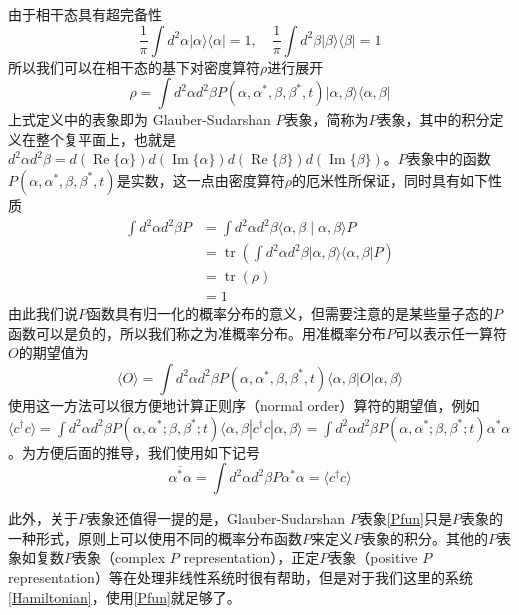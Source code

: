 由于相干态具有超完备性
\begin{equation}
\frac{1}{\pi} \int d^{2} \alpha|\alpha\rangle\langle\alpha|=1, \quad
\frac{1}{\pi} \int d^{2} \beta|\beta\rangle\langle\beta|=1
\end{equation}
所以我们可以在相干态的基下对密度算符$\rho$进行展开
\begin{equation}
\rho=\int d^{2}\alpha d^{2}\beta P(\alpha,\alpha^{*},\beta,\beta^{*},t)|\alpha,\beta\rangle \langle \alpha,\beta| \label{Pfun} 
\end{equation}
上式定义中的表象即为 Glauber-Sudarshan $P$表象，简称为$P$表象，其中的积分定义在整个复平面上，也就是$d^{2} \alpha d^{2} \beta=d(\operatorname{Re}\{\alpha\}) d(\operatorname{Im}\{\alpha\}) d(\operatorname{Re}\{\beta\}) d(\operatorname{Im}\{\beta\})$。$P$表象中的函数$P(\alpha,\alpha^{*},\beta,\beta^{*},t)$是实数，这一点由密度算符$\rho$的厄米性所保证，同时具有如下性质
\begin{equation}
\begin{aligned}
\int d^{2} \alpha d^{2}\beta P &=\int d^{2} \alpha d^{2}\beta \langle\alpha,\beta \mid \alpha,\beta \rangle P \\
&=\operatorname{tr}\left(\int d^{2} \alpha d^{2}\beta |\alpha,\beta\rangle\langle\alpha,\beta| P\right) \\
&=\operatorname{tr}(\rho) \\
&=1
\end{aligned}
\end{equation}
由此我们说$P$函数具有归一化的概率分布的意义，但需要注意的是某些量子态的$P$函数可以是负的，所以我们称之为准概率分布。用准概率分布$P$可以表示任一算符$O$的期望值为
\begin{equation}
\langle{O}\rangle=\int d^{2}\alpha d^{2}\beta P(\alpha,\alpha^{*},\beta,\beta^{*},t)\langle \alpha,\beta|O|\alpha,\beta\rangle
\end{equation}
使用这一方法可以很方便地计算正则序（normal order）算符的期望值，例如$\langle c^{\dagger}c \rangle = \int d^{2}\alpha d^{2}\beta P(\alpha,\alpha^{*};\beta,\beta^{*};t) \langle \alpha,\beta|c^{\dagger}c|\alpha,\beta\rangle = \int d^{2}\alpha d^{2}\beta P(\alpha,\alpha^{*};\beta,\beta^{*};t)\alpha^{*}\alpha$。为方便后面的推导，我们使用如下记号
\begin{equation}
\overline{\alpha^{*}\alpha} = \int d^{2}\alpha d^{2}\beta P\alpha^{*}\alpha = \langle c^{\dagger}c \rangle
\label{MeanDefination}
\end{equation}

此外，关于$P$表象还值得一提的是，Glauber-Sudarshan $P$表象\eqref{Pfun}只是$P$表象的一种形式，原则上可以使用不同的概率分布函数$P$来定义$P$表象的积分\cite{walls2007quantum}。其他的$P$表象如复数$P$表象（complex $P$ representation），正定$P$表象（positive $P$ representation）等在处理非线性系统时很有帮助，但是对于我们这里的系统 \eqref{Hamiltonian}，使用\eqref{Pfun}就足够了。

